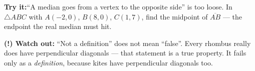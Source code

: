 \documentclass[12pt]{article}
\begin{document}
\begin{tryitbox}
\textbf{Try it:}\quad ``A median goes from a vertex to the opposite side'' is too
loose. In $\triangle ABC$ with $A(-2,0)$, $B(8,0)$, $C(1,7)$, find the midpoint
of $\overline{AB}$ --- the endpoint the real median must hit.\\[2pt]
\end{tryitbox}

\begin{watchoutbox}
\textbf{(!) Watch out:} ``Not a definition'' does not mean ``false''. Every
rhombus really does have perpendicular diagonals --- that statement is a true
property. It fails only as a \emph{definition}, because kites have perpendicular
diagonals too.
\end{watchoutbox}
\end{document}
